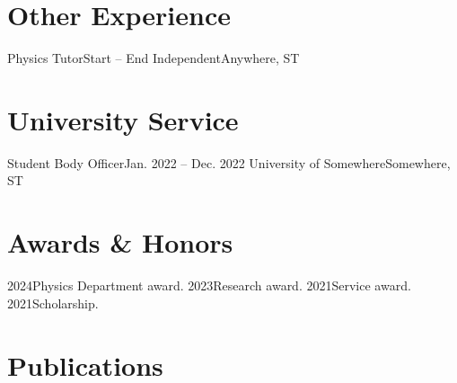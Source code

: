 \documentclass[letterpaper,11pt]{article}
\begin{document}
    \cvSubHeadingListEnd



\section{Other Experience}
    \cvSubHeadingListStart
        \cvSubheading
            {Physics Tutor}{Start -- End}
            {Independent}{Anywhere, ST}
            \cvItemListStart
            \cvItemListEnd
            
    \cvSubHeadingListEnd



\section{University Service}
    \cvSubHeadingListStart
        \cvSubheading
            {Student Body Officer}{Jan. 2022 -- Dec. 2022}
            {University of Somewhere}{Somewhere, ST}
            \cvItemListStart
            \cvItemListEnd

    \cvSubHeadingListEnd



\section{Awards \& Honors}
    \cvSubHeadingListStart
        \cvAwardsItem
            {2024}{Physics Department award.}
        \cvAwardsItem
            {2023}{Research award.}
        \cvAwardsItem
            {2021}{Service award.}
        \cvAwardsItem
            {2021}{Scholarship.}
        
    \cvSubHeadingListEnd



\section{Publications}
    \cvSubHeadingListStart
        \item
        \printbibliography[heading=none]
    \cvSubHeadingListEnd
\end{document}
